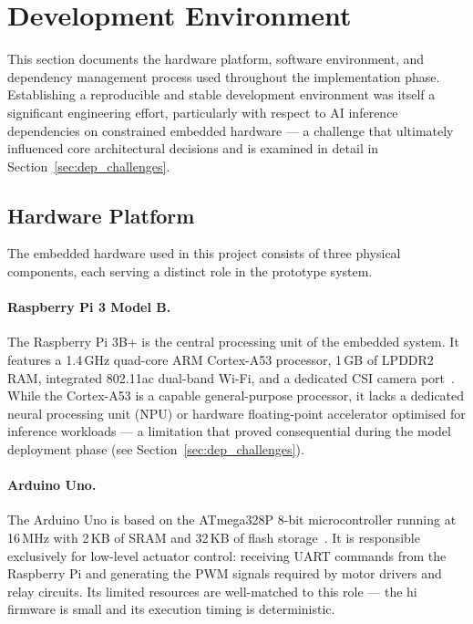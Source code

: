 \section{Development Environment}
\label{sec:devenv}
 
This section documents the hardware platform, software environment,
and dependency management process used throughout the implementation
phase. Establishing a reproducible and stable development environment
was itself a significant engineering effort, particularly with respect
to AI inference dependencies on constrained embedded hardware — a
challenge that ultimately influenced core architectural decisions and
is examined in detail in Section~\ref{sec:dep_challenges}.
 
\subsection{Hardware Platform}
 
The embedded hardware used in this project consists of three physical
components, each serving a distinct role in the prototype system.
 
\paragraph{Raspberry Pi 3 Model B.}
The Raspberry Pi 3B+ is the central processing unit of the embedded
system. It features a 1.4\,GHz quad-core ARM Cortex-A53 processor,
1\,GB of LPDDR2 RAM, integrated 802.11ac dual-band Wi-Fi, and a
dedicated CSI camera port~\cite{upton2016raspberry}. While the
Cortex-A53 is a capable general-purpose processor, it lacks a
dedicated neural processing unit (NPU) or hardware floating-point
accelerator optimised for inference workloads — a limitation that
proved consequential during the model deployment phase (see
Section~\ref{sec:dep_challenges}).
 
\paragraph{Arduino Uno.}
The Arduino Uno is based on the ATmega328P 8-bit microcontroller
running at 16\,MHz with 2\,KB of SRAM and 32\,KB of flash
storage~\cite{monk2016electronics}. It is responsible exclusively for
low-level actuator control: receiving UART commands from the Raspberry
Pi and generating the PWM signals required by motor drivers and relay
circuits. Its limited resources are well-matched to this role — the hi
firmware is small and its execution timing is deterministic.
 
